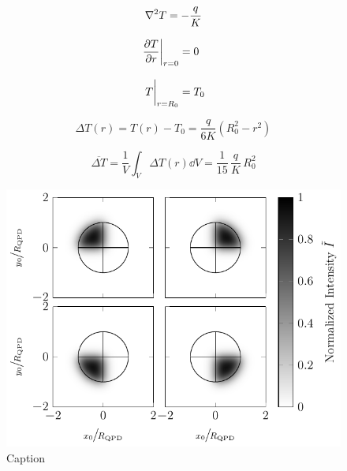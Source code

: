 \begin{equation}
  \laplacian{T} = - \frac{q}{K}
  \label{eq:Th-heat-stat}
\end{equation}


\begin{subequations}
\begin{align}
  \eval{\pdv{T}{r}}_{r=0} &= 0\\[3mm]
  \eval{T}_{r=R_{0}} &= T_{0}
\end{align}
\end{subequations}

\begin{equation}
  \Delta T(r) = T(r) - T_{0} = \frac{q}{6K}\left( R_0^2 - r^{2} \right)
  \label{eq:Th-heat-sol}
\end{equation}

\begin{equation}
  \overline{\Delta T} = \frac{1}{V}\int_{V}\Delta T(r) \dd{V} = 
  \frac{1}{15}\,\frac{q}{K}\,R^{2}_{0}
  \label{eq:Th-heat-avg}
\end{equation}




\lipsum[1-2]

\begin{figure}[tbp]
  \centering
  \includegraphics[]{Plots/cache/V_quadrant.pdf}
  \caption{Caption}
  \label{fig:Th-quadrant_Intensity}
\end{figure}


